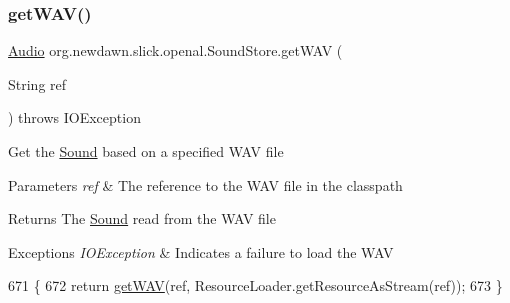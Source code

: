 \subsubsection{\texorpdfstring{get\+W\+A\+V()}{getWAV()}\hspace{0.1cm}{\footnotesize\ttfamily [1/3]}}
{\footnotesize\ttfamily \mbox{\hyperlink{interfaceorg_1_1newdawn_1_1slick_1_1openal_1_1_audio}{Audio}} org.\+newdawn.\+slick.\+openal.\+Sound\+Store.\+get\+W\+AV (\begin{DoxyParamCaption}\item[{String}]{ref }\end{DoxyParamCaption}) throws I\+O\+Exception\hspace{0.3cm}{\ttfamily [inline]}}

Get the \mbox{\hyperlink{classorg_1_1newdawn_1_1slick_1_1_sound}{Sound}} based on a specified W\+AV file


\begin{DoxyParams}{Parameters}
{\em ref} & The reference to the W\+AV file in the classpath \\
\hline
\end{DoxyParams}
\begin{DoxyReturn}{Returns}
The \mbox{\hyperlink{classorg_1_1newdawn_1_1slick_1_1_sound}{Sound}} read from the W\+AV file 
\end{DoxyReturn}

\begin{DoxyExceptions}{Exceptions}
{\em I\+O\+Exception} & Indicates a failure to load the W\+AV \\
\hline
\end{DoxyExceptions}

\begin{DoxyCode}
671                                                        \{
672         \textcolor{keywordflow}{return} \mbox{\hyperlink{classorg_1_1newdawn_1_1slick_1_1openal_1_1_sound_store_a7ebe093db6c98d29e5673158d0ac4191}{getWAV}}(ref, ResourceLoader.getResourceAsStream(ref));
673     \}
\end{DoxyCode}
\mbox{\label{classorg_1_1newdawn_1_1slick_1_1openal_1_1_sound_store_a9921804be6cb949ffd501f22100c0b30}} 
